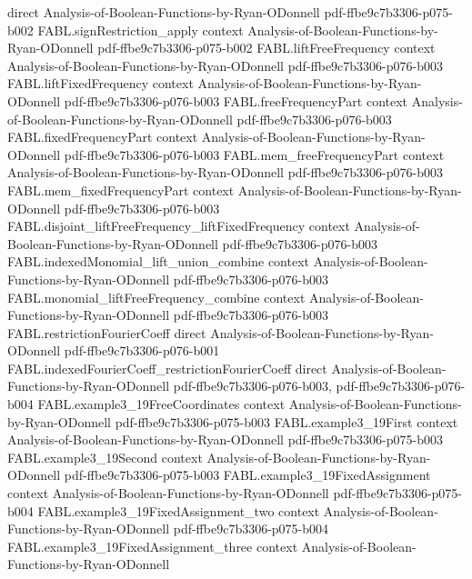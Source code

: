 \begin{theorem}
  {direct}
  {Analysis-of-Boolean-Functions-by-Ryan-ODonnell}
  {pdf-ffbe9c7b3306-p075-b002}
\proofstep
  {FABL.signRestriction_apply}
  {context}
  {Analysis-of-Boolean-Functions-by-Ryan-ODonnell}
  {pdf-ffbe9c7b3306-p075-b002}
\proofstep
  {FABL.liftFreeFrequency}
  {context}
  {Analysis-of-Boolean-Functions-by-Ryan-ODonnell}
  {pdf-ffbe9c7b3306-p076-b003}
\proofstep
  {FABL.liftFixedFrequency}
  {context}
  {Analysis-of-Boolean-Functions-by-Ryan-ODonnell}
  {pdf-ffbe9c7b3306-p076-b003}
\proofstep
  {FABL.freeFrequencyPart}
  {context}
  {Analysis-of-Boolean-Functions-by-Ryan-ODonnell}
  {pdf-ffbe9c7b3306-p076-b003}
\proofstep
  {FABL.fixedFrequencyPart}
  {context}
  {Analysis-of-Boolean-Functions-by-Ryan-ODonnell}
  {pdf-ffbe9c7b3306-p076-b003}
\proofstep
  {FABL.mem_freeFrequencyPart}
  {context}
  {Analysis-of-Boolean-Functions-by-Ryan-ODonnell}
  {pdf-ffbe9c7b3306-p076-b003}
\proofstep
  {FABL.mem_fixedFrequencyPart}
  {context}
  {Analysis-of-Boolean-Functions-by-Ryan-ODonnell}
  {pdf-ffbe9c7b3306-p076-b003}
\proofstep
  {FABL.disjoint_liftFreeFrequency_liftFixedFrequency}
  {context}
  {Analysis-of-Boolean-Functions-by-Ryan-ODonnell}
  {pdf-ffbe9c7b3306-p076-b003}
\proofstep
  {FABL.indexedMonomial_lift_union_combine}
  {context}
  {Analysis-of-Boolean-Functions-by-Ryan-ODonnell}
  {pdf-ffbe9c7b3306-p076-b003}
\proofstep
  {FABL.monomial_liftFreeFrequency_combine}
  {context}
  {Analysis-of-Boolean-Functions-by-Ryan-ODonnell}
  {pdf-ffbe9c7b3306-p076-b003}
\proofstep
  {FABL.restrictionFourierCoeff}
  {direct}
  {Analysis-of-Boolean-Functions-by-Ryan-ODonnell}
  {pdf-ffbe9c7b3306-p076-b001}
\proofstep
  {FABL.indexedFourierCoeff_restrictionFourierCoeff}
  {direct}
  {Analysis-of-Boolean-Functions-by-Ryan-ODonnell}
  {pdf-ffbe9c7b3306-p076-b003,
    pdf-ffbe9c7b3306-p076-b004}
\proofstep
  {FABL.example3_19FreeCoordinates}
  {context}
  {Analysis-of-Boolean-Functions-by-Ryan-ODonnell}
  {pdf-ffbe9c7b3306-p075-b003}
\proofstep
  {FABL.example3_19First}
  {context}
  {Analysis-of-Boolean-Functions-by-Ryan-ODonnell}
  {pdf-ffbe9c7b3306-p075-b003}
\proofstep
  {FABL.example3_19Second}
  {context}
  {Analysis-of-Boolean-Functions-by-Ryan-ODonnell}
  {pdf-ffbe9c7b3306-p075-b003}
\proofstep
  {FABL.example3_19FixedAssignment}
  {context}
  {Analysis-of-Boolean-Functions-by-Ryan-ODonnell}
  {pdf-ffbe9c7b3306-p075-b004}
\proofstep
  {FABL.example3_19FixedAssignment_two}
  {context}
  {Analysis-of-Boolean-Functions-by-Ryan-ODonnell}
  {pdf-ffbe9c7b3306-p075-b004}
\proofstep
  {FABL.example3_19FixedAssignment_three}
  {context}
  {Analysis-of-Boolean-Functions-by-Ryan-ODonnell}

\end{theorem}
